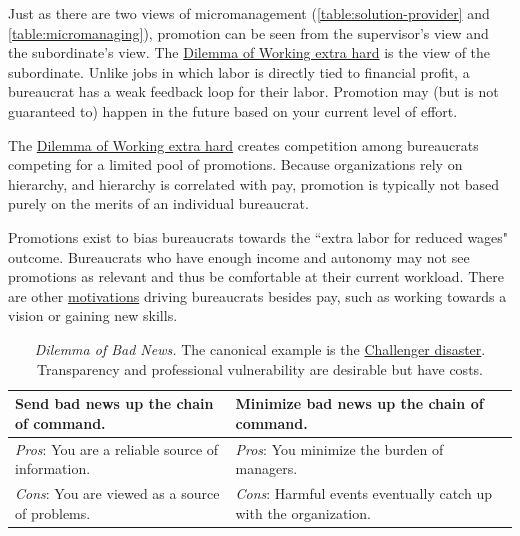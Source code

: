 Just as there are two views of micromanagement (\ref{table:solution-provider} and \ref{table:micromanaging}), promotion can be seen from the supervisor's view and the subordinate's view. The \href{table:work-extra-or-work-as-expected}{Dilemma of Working extra hard} is the view of the subordinate. Unlike jobs in which labor is directly tied to financial profit, a bureaucrat has a weak feedback loop for their labor. Promotion may (but is not guaranteed to) happen in the future based on your current level of effort. 

The \href{table:work-extra-or-work-as-expected}{Dilemma of Working extra hard} creates competition among bureaucrats competing for a limited pool of promotions. Because organizations rely on hierarchy, and hierarchy is correlated with pay, promotion is typically not based purely on the merits of an individual bureaucrat. 

Promotions exist to bias bureaucrats towards the ``extra labor for reduced wages" outcome. Bureaucrats who have enough income and autonomy may not see promotions as relevant and thus be comfortable at their current workload. There are other \hyperref[sec:motivations]{motivations} driving bureaucrats besides pay, such as working towards a vision or gaining new skills. 

\begin{center}
\begin{table}[H] %
\begin{tabular}{ | m{\dilemmatablewidth}| m{\dilemmatablewidth} | } 
  \hline
  \textbf{Send bad news up the chain of command.} &
  \textbf{Minimize bad news up the chain of command.} \\
  \hline
  \textit{Pros}: You are a reliable source of information. &
  \textit{Pros}: You minimize the burden of managers. \\
  \hline
  \textit{Cons}: You are viewed as a source of problems. & 
  \textit{Cons}: Harmful events eventually catch up with the organization.  \\
  \hline
\end{tabular}
\caption{\textit{Dilemma of Bad News.}
The canonical example is the \href{https://en.wikipedia.org/wiki/Space_Shuttle_Challenger_disaster}{Challenger disaster}. 
Transparency and professional vulnerability are desirable but have costs.}
\label{table:bad-news-up-the-chain}
\end{table}
\end{center}

